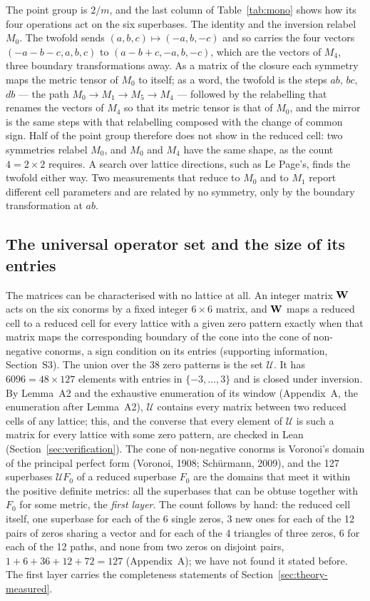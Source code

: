 The point group is $2/m$, and the last column of Table~\ref{tab:mono} shows how its four operations act on the six superbases. The identity and the inversion relabel $M_0$. The twofold sends $(a,b,c)\mapsto(-a,b,-c)$ and so carries the four vectors $(-a-b-c,a,b,c)$ to $(a-b+c,-a,b,-c)$, which are the vectors of $M_4$, three boundary transformations away. As a matrix of the closure each symmetry maps the metric tensor of $M_0$ to itself; as a word, the twofold is the steps $ab$, $bc$, $db$ --- the path $M_0\to M_1\to M_5\to M_4$ --- followed by the relabelling that renames the vectors of $M_4$ so that its metric tensor is that of $M_0$, and the mirror is the same steps with that relabelling composed with the change of common sign. Half of the point group therefore does not show in the reduced cell: two symmetries relabel $M_0$, and $M_0$ and $M_4$ have the same shape, as the count $4=2\times2$ requires. A search over lattice directions, such as Le Page's, finds the twofold either way. Two measurements that reduce to $M_0$ and to $M_1$ report different cell parameters and are related by no symmetry, only by the boundary transformation at $ab$.

\subsection{The universal operator set and the size of its entries}
\label{sec:universal}
The matrices can be characterised with no lattice at all. An integer matrix $\Wop$ acts on the six conorms by a fixed integer $6\times6$ matrix, and $\Wop$ maps a reduced cell to a reduced cell for every lattice with a given zero pattern exactly when that matrix maps the corresponding boundary of the cone into the cone of non-negative conorms, a sign condition on its entries (supporting information, Section~S3). The union over the 38 zero patterns is the set $\mathcal U$. It has $6096=48\times127$ elements with entries in $\{-3,\dots,3\}$ and is closed under inversion. By Lemma~A2 and the exhaustive enumeration of its window (Appendix~A, the enumeration after Lemma~A2), $\mathcal U$ contains every matrix between two reduced cells of any lattice; this, and the converse that every element of $\mathcal U$ is such a matrix for every lattice with some zero pattern, are checked in Lean (Section~\ref{sec:verification}). The cone of non-negative conorms is Voronoi's domain of the principal perfect form (Voronoi, 1908; Sch\"urmann, 2009), and the 127 superbases $\mathcal UF_0$ of a reduced superbase $F_0$ are the domains that meet it within the positive definite metrics: all the superbases that can be obtuse together with $F_0$ for some metric, the \emph{first layer}. The count follows by hand: the reduced cell itself, one superbase for each of the 6 single zeros, 3 new ones for each of the 12 pairs of zeros sharing a vector and for each of the 4 triangles of three zeros, 6 for each of the 12 paths, and none from two zeros on disjoint pairs, $1+6+36+12+72=127$ (Appendix~A); we have not found it stated before. The first layer carries the completeness statements of Section~\ref{sec:theory-measured}.

